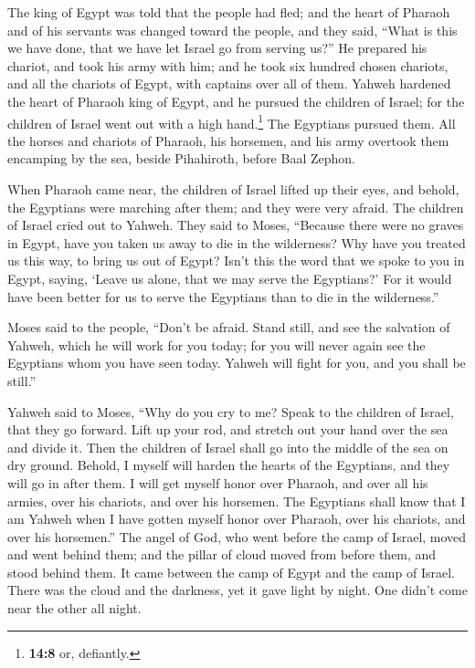  The king of Egypt was told that the people had fled; and
the heart of Pharaoh and of his servants was changed toward the people,
and they said, ``What is this we have done, that we have let Israel go
from serving us?''  He prepared his chariot, and took his
army with him;  and he took six hundred chosen chariots,
and all the chariots of Egypt, with captains over all of them.
 Yahweh hardened the heart of Pharaoh king of Egypt, and
he pursued the children of Israel; for the children of Israel went out
with a high hand.\footnote{\textbf{14:8} or, defiantly.} 
The Egyptians pursued them. All the horses and chariots of Pharaoh, his
horsemen, and his army overtook them encamping by the sea, beside
Pihahiroth, before Baal Zephon.

 When Pharaoh came near, the children of Israel lifted up
their eyes, and behold, the Egyptians were marching after them; and they
were very afraid. The children of Israel cried out to Yahweh.
 They said to Moses, ``Because there were no graves in
Egypt, have you taken us away to die in the wilderness? Why have you
treated us this way, to bring us out of Egypt?  Isn't
this the word that we spoke to you in Egypt, saying, `Leave us alone,
that we may serve the Egyptians?' For it would have been better for us
to serve the Egyptians than to die in the wilderness.''

 Moses said to the people, ``Don't be afraid. Stand
still, and see the salvation of Yahweh, which he will work for you
today; for you will never again see the Egyptians whom you have seen
today.  Yahweh will fight for you, and you shall be
still.''

 Yahweh said to Moses, ``Why do you cry to me? Speak to
the children of Israel, that they go forward.  Lift up
your rod, and stretch out your hand over the sea and divide it. Then the
children of Israel shall go into the middle of the sea on dry ground.
 Behold, I myself will harden the hearts of the
Egyptians, and they will go in after them. I will get myself honor over
Pharaoh, and over all his armies, over his chariots, and over his
horsemen.  The Egyptians shall know that I am Yahweh when
I have gotten myself honor over Pharaoh, over his chariots, and over his
horsemen.''  The angel of God, who went before the camp
of Israel, moved and went behind them; and the pillar of cloud moved
from before them, and stood behind them.  It came between
the camp of Egypt and the camp of Israel. There was the cloud and the
darkness, yet it gave light by night. One didn't come near the other all
night.

